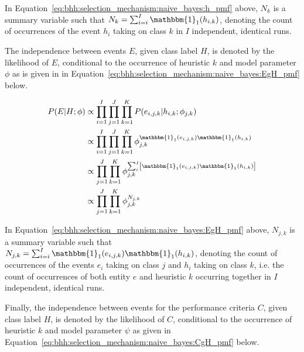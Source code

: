 In Equation~\eqref{eq:bhh:selection_mechanism:naive_bayes:h_pmf} above, $N_{k}$ is a summary variable such that $N_{k} = \sum_{i=i}^{I} \mathbbm{1}_{1}(h_{i,k})$, denoting the count of occurrences of the event $h_{i}$ taking on class $k$ in $I$ independent, identical runs.

The independence between events $E$, given class label $H$, is denoted by the likelihood of $E$,
conditional to the occurrence of heuristic $k$ and model parameter $\phi$ as is given in in Equation~\eqref{eq:bhh:selection_mechanism:naive_bayes:EgH_pmf} below.

\begin{equation}
      \label{eq:bhh:selection_mechanism:naive_bayes:EgH_pmf}
      \begin{split}
            P(E \vert H;  \phi)
            &\propto \prod_{i=1}^{I} \prod_{j=1}^{J} \prod_{k=1}^{K} P(e_{i,j,k} \vert h_{i,k} ; \phi_{j,k})  \\
            &\propto \prod_{i=1}^{I} \prod_{j=1}^{J} \prod_{k=1}^{K} \phi_{j,k}^{\mathbbm{1}_{1}(e_{i,j,k})\mathbbm{1}_{1}(h_{i,k})} \\
            &\propto \prod_{j=1}^{J} \prod_{k=1}^{K} \phi_{j,k}^{ \sum_{i}^{I} \left[ \mathbbm{1}_{1}(e_{i,j,k}) \mathbbm{1}_{1}(h_{i,k}) \right]} \\
            &\propto \prod_{j=1}^{J} \prod_{k=1}^{K} \phi_{j,k}^{N_{j,k}}
      \end{split}
\end{equation}

In Equation~\eqref{eq:bhh:selection_mechanism:naive_bayes:EgH_pmf} above, $N_{j,k}$ is a summary variable such that $N_{j,k} = \sum_{i=i}^{I} \mathbbm{1}_{1}(e_{i,j,k})\mathbbm{1}_{1}(h_{i,k})$, denoting the count of occurrences of the events $e_{i}$ taking on class $j$ and $h_{i}$ taking on class $k$, i.e. the count of occurrences of both entity $e$ and heuristic $k$ occurring together in $I$ independent, identical runs.

Finally, the independence between events for the performance criteria $C$, given class label $H$, is denoted by the likelihood of $C$, conditional to the occurrence of heuristic $k$ and model parameter $\psi$ as given in Equation~\eqref{eq:bhh:selection_mechanism:naive_bayes:CgH_pmf} below.

